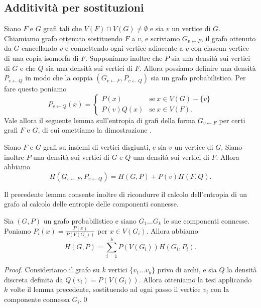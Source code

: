 \subsection{Additività per sostituzioni}
Siano \(F\) e \(G\) grafi tali che \(V(F)\cap V(G)\neq \emptyset\) e sia \(v\) un vertice di \(G\). Chiamiamo grafo ottenuto sostituendo \(F\) a \(v\), e scriviamo \(G_{v\leftarrow F}\), il grafo ottenuto da \(G\) cancellando \(v\) e connettendo ogni vertice adiacente a \(v\) con ciascun vertice di una copia isomorfa di \(F\). Supponiamo inoltre che \(P\) sia una densità sui vertici di \(G\) e che \(Q\) sia una densità sui vertici di \(F\). Allora possiamo definire una densità \(P_{v\leftarrow Q}\) in modo che la coppia \((G_{v\leftarrow F}, P_{v\leftarrow Q})\) sia un grafo probabilistico. Per fare questo poniamo
\[P_{v\leftarrow Q}(x)= 
\begin{cases}
	P(x) & \text{se}\ x\in V(G)-\{v\}\\
	P(v)Q(x) & \text{se}\ x\in V(F)\text{.}
\end{cases}
\]
Vale allora il seguente lemma sull'entropia di grafi della forma \(G_{v\leftarrow F}\) per certi grafi \(F\) e \(G\), di cui omettiamo la dimostrazione \cite{Korner1992}.
\begin{lemma}
	Siano \(F\) e \(G\) grafi su insiemi di vertici disgiunti, e sia \(v\) un vertice di \(G\). Siano inoltre \(P\) una densità sui vertici di \(G\) e \(Q\) una densità sui vertici di \(F\). Allora abbiamo
	\[H(G_{v\leftarrow F}, P_{v\leftarrow Q})=H(G,P)+P(v)H(F,Q).\]
\end{lemma}
Il precedente lemma consente inoltre di ricondurre il calcolo dell'entropia di un grafo al calcolo delle entropie delle componenti connesse.
\begin{corollary}
	Sia \((G,P)\) un grafo probabilistico e siano \(G_{1}\dots G_{k}\) le sue componenti connesse. Poniamo \(P_i(x)=\frac{P(x)}{P(V(G_i))}\) per \(x\in V(G_i)\). Allora abbiamo
	\[H(G,P)=\sum_{i=1}^k P(V(G_i))H(G_i,P_i).\]
\end{corollary}
\begin{proof}
	Consideriamo il grafo su \(k\) vertici \(\{v_{1}\dots v_{k}\}\) privo di archi, e sia \(Q\) la densità discreta definita da \(Q(v_{i}) = P(V(G_i))\). Allora otteniamo la tesi applicando \(k\) volte il lemma precedente, sostituendo ad ogni passo il vertice \(v_i\) con la componente connessa \(G_{i}\).\qed 
\end{proof}

